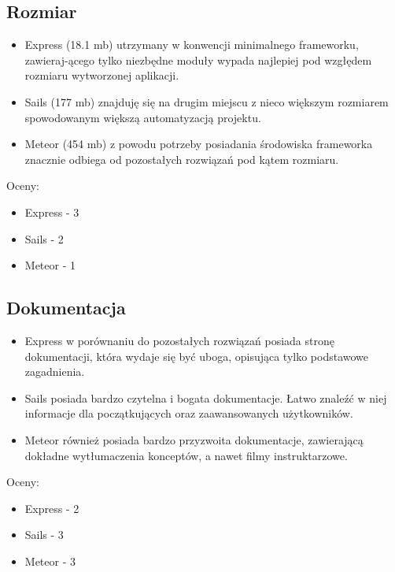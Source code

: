 \documentclass[12pt]{report}
\begin{document}
    \pagebreak
    \subsection{Rozmiar}
      \begin{itemize}
        \item Express (18.1 mb) utrzymany w konwencji minimalnego frameworku, zawieraj-ącego tylko niezbędne moduły wypada najlepiej pod wzgłędem rozmiaru wytworzonej aplikacji.
        \item Sails (177 mb) znajduję się na drugim miejscu z nieco większym rozmiarem spowodowanym większą automatyzacją projektu.
        \item Meteor (454 mb) z powodu potrzeby posiadania środowiska frameworka znacznie odbiega od pozostałych rozwiązań pod kątem rozmiaru.
      \end{itemize}
      Oceny:
      \begin{itemize}
        \item Express - 3
        \item Sails - 2
        \item Meteor - 1
      \end{itemize}
      
    \subsection{Dokumentacja}
      \begin{itemize}
        \item Express w porównaniu do pozostałych rozwiązań posiada stronę dokumentacji, która wydaje się być uboga, opisująca tylko podstawowe zagadnienia.
        \item Sails posiada bardzo czytelna i bogata dokumentacje. Łatwo znaleźć w niej informacje dla początkujących oraz zaawansowanych użytkowników.
        \item Meteor również posiada bardzo przyzwoita dokumentacje, zawierającą dokładne wytłumaczenia konceptów, a nawet filmy instruktarzowe.
      \end{itemize}
      Oceny:
      \begin{itemize}
        \item Express - 2
        \item Sails - 3
        \item Meteor - 3
      \end{itemize}
      
\end{document}
